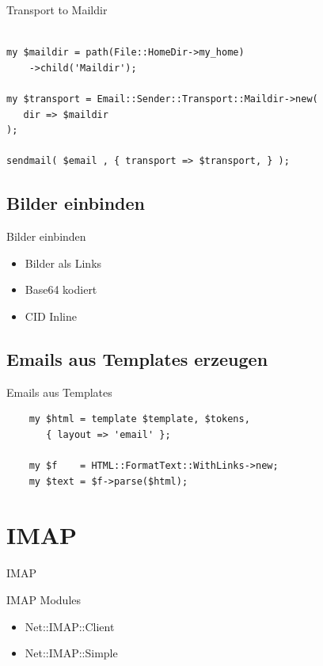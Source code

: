 \begin{frame}[fragile]{Transport to Maildir}
  \begin{lstlisting}

my $maildir = path(File::HomeDir->my_home)
    ->child('Maildir');

my $transport = Email::Sender::Transport::Maildir->new(
   dir => $maildir
);

sendmail( $email , { transport => $transport, } );

\end{lstlisting}
\end{frame}

\subsection{Bilder einbinden}

\begin{frame}{Bilder einbinden}
  \begin{itemize}
  \item Bilder als Links
  \item Base64 kodiert
  \item CID Inline
  \end{itemize}
\end{frame}


\subsection{Emails aus Templates erzeugen}

\begin{frame}[fragile]{Emails aus Templates}
  \begin{lstlisting}
    my $html = template $template, $tokens,
       { layout => 'email' };

    my $f    = HTML::FormatText::WithLinks->new;
    my $text = $f->parse($html);
  \end{lstlisting}
\end{frame}

\section{IMAP}

\begin{frame}{IMAP}
\end{frame}

\begin{frame}{IMAP Modules}
  \begin{itemize}
  \item Net::IMAP::Client
  \item Net::IMAP::Simple
  \end{itemize}
\end{frame}

